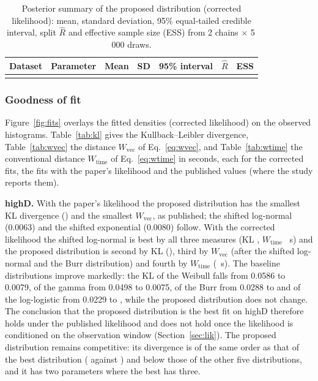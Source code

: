 \documentclass[11pt,a4paper]{article}
\numberwithin{equation}{section}
\newcommand{\Wvec}{W_{\mathrm{vec}}}
\newcommand{\Wtime}{W_{\mathrm{time}}}
\begin{document}
\begin{table}[H]
\centering\small
\caption{Posterior summary of the proposed distribution (corrected likelihood): mean, standard deviation, 95\% equal-tailed credible interval, split $\hat R$ and effective sample size (ESS) from 2 chains $\times$ 5\,000 draws.}
\label{tab:post}
\begin{tabular}{@{}llrrcrr@{}}
\toprule
Dataset & Parameter & Mean & SD & 95\% interval & $\hat R$ & ESS \\
\midrule
\\
\bottomrule
\end{tabular}
\end{table}

\subsubsection{Goodness of fit}\label{sec:gof}
Figure~\ref{fig:fits} overlays the fitted densities (corrected likelihood) on the observed histograms. Table~\ref{tab:kl} gives the Kullback--Leibler divergence, Table~\ref{tab:wvec} the distance $\Wvec$ of Eq.~\eqref{eq:wvec}, and Table~\ref{tab:wtime} the
conventional distance $\Wtime$ of Eq.~\eqref{eq:wtime} in seconds, each for the corrected fits, the fits with the paper's likelihood and the published values (where the study reports them).

\textbf{highD.} With the paper's likelihood the proposed distribution has the smallest KL divergence (\hdKLPropPaper) and the smallest $\Wvec$, as published; the shifted log-normal (0.0063) and the shifted exponential (0.0080) follow. With the corrected likelihood the
shifted log-normal is best by all three measures (KL \hdKLSLN, $\Wtime$ \hdWtimeBestVal~s) and the proposed distribution is second by KL (\hdKLProp), third by $\Wvec$ (after the shifted log-normal and the Burr distribution) and fourth by $\Wtime$ (\hdWtimeProp~s). The baseline distributions improve markedly: the KL of the Weibull falls from 0.0586 to 0.0079,
of the gamma from 0.0498 to 0.0075, of the Burr from 0.0288 to \hdKLBurr{} and of the log-logistic from 0.0229 to \hdKLLLog, while the proposed distribution does not change. The conclusion that the proposed distribution is the best fit on highD therefore holds under the published likelihood and does not hold once the likelihood is conditioned on the observation window (Section~\ref{sec:lik}).
The proposed distribution remains competitive: its divergence is of the same order as that of the best distribution (\hdKLProp{} against \hdKLSLN) and below those of the other five distributions, and it has two parameters where the best has three.
\end{document}
